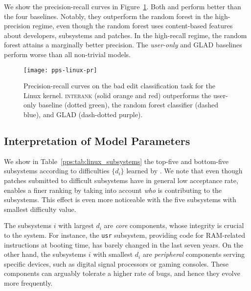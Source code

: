 We show the precision-recall curves in Figure~\ref{pps:fig:linux_results}.
Both  and  perform better than the four baselines.
Notably, they outperform the random forest in the high-precision regime, even though the random forest uses content-based features about developers, subsystems and patches.
In the high-recall regime, the random forest attains a marginally better precision.
The \emph{user-only} and GLAD baselines perform worse than all non-trivial models.

\begin{figure}
	\texttt{[image: pps-linux-pr]}
	\caption{Precision-recall curves on the bad edit classification task for the Linux kernel. \textsc{interank} (solid orange and red) outperforms the user-only baseline (dotted green), the random forest classifier (dashed blue), and GLAD (dash-dotted purple).}
	\label{pps:fig:linux_results}
\end{figure}

\subsection{Interpretation of Model Parameters}

We show in Table~\ref{pps:tab:linux_subsystems} the top-five and bottom-five subsystems according to  difficulties $\{d_i\}$ learned by .
We note that even though patches submitted to difficult subsystems have in general low acceptance rate, \interank{} enables a finer ranking by taking into account \emph{who} is contributing to the subsystems.
This effect is even more noticeable with the five subsystems with smallest difficulty value.

The subsystems $i$ with largest $d_i$ are \emph{core} components, whose integrity is crucial to the system.
For instance, the \texttt{usr} subsystem, providing code for RAM-related instructions at booting time, has barely changed in the last seven years.
On the other hand, the subsystems $i$ with smallest $d_i$ are \textit{peripheral} components serving specific devices, such as digital signal processors or gaming consoles.
These components can arguably tolerate a higher rate of bugs, and hence they evolve more frequently.

